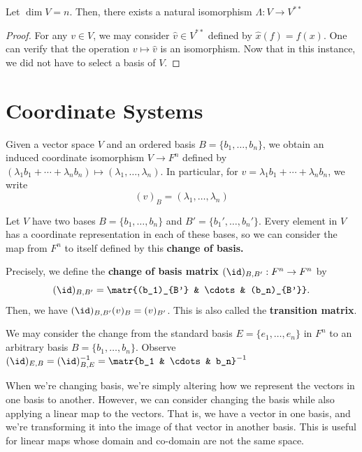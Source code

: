 \begin{thm}
    Let $\dim V=n$. Then, there exists a natural isomorphism $\Lambda :V \to V^{**}$
\end{thm}

\begin{proof}
    For any $v \in V$, we may consider $\hat v \in V^{**}$ defined by $\hat x(f) = f(x)$. One can verify that the operation $v \mapsto \hat v$ is an isomorphism. Now that in this instance, we did not have to select a basis of $V$.
\end{proof}

\section{Coordinate Systems}

\begin{defn}
    Given a vector space $V$ and an ordered basis $B=\{b_1,\dots,b_n\}$, we obtain an induced coordinate isomorphism $V \to F^n$ defined by $(\lambda_1b_1+\cdots +\lambda_nb_n) \mapsto (\lambda_1,\dots,\lambda_n)$. In particular, for $v=\lambda_1b_1+\cdots + \lambda_nb_n$, we write
    $$(v)_B = (\lambda_1,\dots,\lambda_n)$$
\end{defn}

\begin{defn}
    Let $V$ have two bases $B=\{b_1,\dots,b_n\}$ and $B'=\{b_1',\dots,b_n'\}$. Every element in $V$ has a coordinate representation in each of these bases, so we can consider the map from $F^n$ to itself defined by this \textbf{change of basis.}

    Precisely, we define the \textbf{change of basis matrix} $(\id )_{B,B'}:F^n\to F^n$ by
    $$(\id )_{B,B'} =\matr{(b_1)_{B'} & \cdots  & (b_n)_{B'}}.$$
    Then, we have $(\id)_{B,B'}(v)_B = (v)_{B'}$. This is also called the \textbf{transition matrix}.
\end{defn}

\begin{ex}
    We may consider the change from the standard basis $E=\{e_1,\dots,e_n\}$ in $F^n$ to an arbitrary basis $B = \{b_1,\dots,b_n\}$. Observe $(\id)_{E,B}=(\id)_{B,E}^{-1}=\matr{b_1  & \cdots & b_n}^{-1}$
\end{ex}

When we're changing basis, we're simply altering how we represent the vectors in one basis to another. However, we can consider changing the basis while also applying a linear map to the vectors. That is, we have a vector in one basis, and we're transforming it into the image of that vector in another basis. This is useful for linear maps whose domain and co-domain are not the same space.

